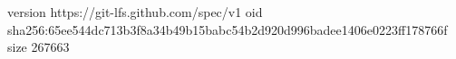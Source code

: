 version https://git-lfs.github.com/spec/v1
oid sha256:65ee544dc713b3f8a34b49b15babc54b2d920d996badee1406e0223ff178766f
size 267663
